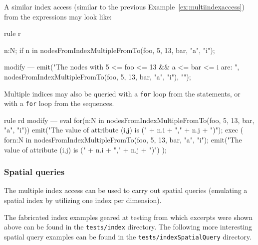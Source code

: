 \begin{example}

A similar index access (similar to the previous Example~\ref{ex:multiindexaccess}) from the expressions may look like:

\begin{grgen}
rule r {
  n:N;
  if { n in nodesFromIndexMultipleFromTo(foo, 5, 13, bar, "a", "i"); }

  modify {
  ---
    emit("The nodes with 5 <= foo <= 13 && a <= bar <= i are: ", nodesFromIndexMultipleFromTo(foo, 5, 13, bar, "a", "i"), "\n");
  }
}
\end{grgen}

Multiple indices may also be queried with a \texttt{for} loop from the statements, or with a \texttt{for} loop from the sequences.

\begin{grgen}
rule rd {
  modify {
  ---
    eval {
      for(n:N in nodesFromIndexMultipleFromTo(foo, 5, 13, bar, "a", "i")) {
        emit("The value of attribute (i,j) is (" + n.i + "," + n.j + ")\n");
      }
    }
    exec (
      for{n:N in nodesFromIndexMultipleFromTo(foo, 5, 13, bar, "a", "i");
        { emit("The value of attribute (i,j) is (" + n.i + "," + n.j + ")\n") }
      }
    );
  }
}
\end{grgen}

\end{example}


\subsubsection*{Spatial queries}

The multiple index access can be used to carry out spatial queries (emulating a spatial index by utilizing one index per dimension).

The fabricated index examples geared at testing from which excerpts were shown above can be found in the \texttt{tests/index} directory.
The following more interesting spatial query examples can be found in the \texttt{tests/index\-Spatial\-Query} directory.


